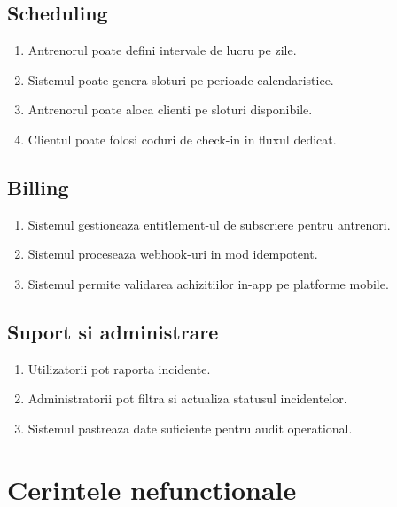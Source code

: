 \subsection{Scheduling}

\begin{enumerate}[leftmargin=1.2cm]
    \item Antrenorul poate defini intervale de lucru pe zile.
    \item Sistemul poate genera sloturi pe perioade calendaristice.
    \item Antrenorul poate aloca clienti pe sloturi disponibile.
    \item Clientul poate folosi coduri de check-in in fluxul dedicat.
\end{enumerate}

\subsection{Billing}

\begin{enumerate}[leftmargin=1.2cm]
    \item Sistemul gestioneaza entitlement-ul de subscriere pentru antrenori.
    \item Sistemul proceseaza webhook-uri in mod idempotent.
    \item Sistemul permite validarea achizitiilor in-app pe platforme mobile.
\end{enumerate}

\subsection{Suport si administrare}

\begin{enumerate}[leftmargin=1.2cm]
    \item Utilizatorii pot raporta incidente.
    \item Administratorii pot filtra si actualiza statusul incidentelor.
    \item Sistemul pastreaza date suficiente pentru audit operational.
\end{enumerate}

\section{Cerintele nefunctionale}

